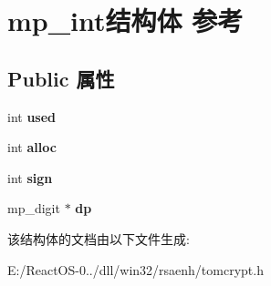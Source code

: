 \hypertarget{structmp__int}{}\section{mp\+\_\+int结构体 参考}
\label{structmp__int}
\subsection*{Public 属性}
\begin{DoxyCompactItemize}
\item 
\mbox{\label{structmp__int_ad26d0a09bb12d9f02327a45fba4a01d5}} 
int {\bfseries used}
\item 
\mbox{\label{structmp__int_af6de13163a5b61f64a6bad1f8ac332ac}} 
int {\bfseries alloc}
\item 
\mbox{\label{structmp__int_ae7db3a529b05a086bdc17f7916f02ea1}} 
int {\bfseries sign}
\item 
\mbox{\label{structmp__int_a34203e2134f2d1e040f799c53f19c161}} 
mp\+\_\+digit $\ast$ {\bfseries dp}
\end{DoxyCompactItemize}


该结构体的文档由以下文件生成\+:\begin{DoxyCompactItemize}
\item 
E\+:/\+React\+O\+S-\/0../dll/win32/rsaenh/tomcrypt.\+h\end{DoxyCompactItemize}
